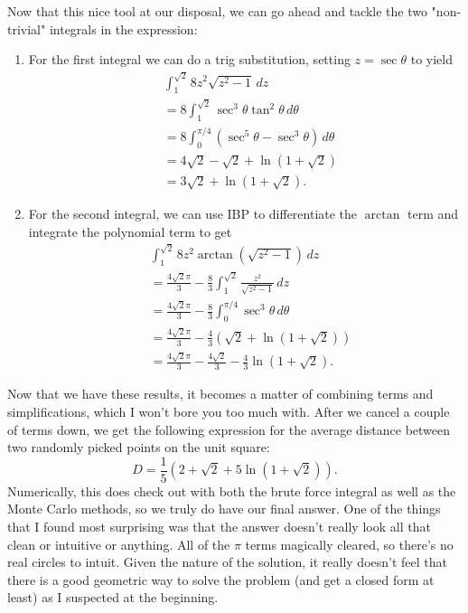 Now that this nice tool at our disposal, we can go ahead and tackle the two "non-trivial" integrals in the expression:
\begin{enumerate}
    \item For the first integral we can do a trig substitution, setting \( z = \sec{\theta} \) to yield
    \begin{align*}
        &\int_{1}^{\sqrt{2}} 8z^2 \sqrt{z^2 - 1} \, dz \\
        &= 8 \int_{1}^{\sqrt{2}} \sec^3{\theta} \tan^2{\theta} \, d\theta \\
        &= 8 \int_{0}^{\pi / 4} \left( \sec^5{\theta} - \sec^3{\theta} \right) \, d\theta \\
        &= 4 \sqrt{2} - \sqrt{2} + \ln{\left( 1 + \sqrt{2} \right)} \\
        &= 3 \sqrt{2} + \ln{\left( 1 + \sqrt{2} \right)}
    .\end{align*}

    \item For the second integral, we can use IBP to differentiate the \( \arctan \) term and integrate the polynomial term to get
    \begin{align*}
        &\int_{1}^{\sqrt{2}} 8z^2 \arctan{\left( \sqrt{z^2 - 1} \right)} \, dz \\
        &= \frac{4 \sqrt{2} \pi}{3} - \frac{8}{3} \int_{1}^{\sqrt{2}} \frac{z^2}{\sqrt{z^2 - 1}} \, dz \\
        &= \frac{4 \sqrt{2} \pi}{3} - \frac{8}{3} \int_{0}^{\pi / 4} \sec^3{\theta} \, d\theta \\
        &= \frac{4 \sqrt{2} \pi}{3} - \frac{4}{3} \left( \sqrt{2} + \ln{\left( 1 + \sqrt{2} \right)} \right) \\
        &= \frac{4 \sqrt{2} \pi}{3} - \frac{4 \sqrt{2}}{3} - \frac{4}{3} \ln{\left( 1 + \sqrt{2} \right)}
    .\end{align*}
\end{enumerate}
Now that we have these results, it becomes a matter of combining terms and
simplifications, which I won't bore you too much with. After we cancel a couple
of terms down,  we get the
following expression for the average distance between two randomly picked
points on the unit square:
\[
    D = \boxed{\frac{1}{5} \left( 2 + \sqrt{2} + 5 \ln{\left( 1 + \sqrt{2} \right)} \right)}
.\]
Numerically, this does check out with both the brute force integral as well as
the Monte Carlo methods, so we truly do have our final answer. One of the
things that I found most surprising was that the answer doesn't really look all
that clean or intuitive or anything. All of the \( \pi \) terms magically
cleared, so there's no real circles to intuit. Given the nature of the
solution, it really doesn't feel that there is a good geometric way to solve
the problem (and get a closed form at least) as I suspected at the beginning.

